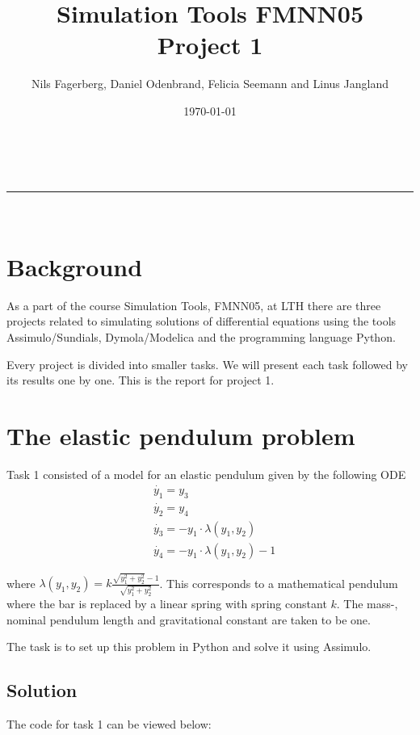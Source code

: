 \documentclass[a4paper,11pt]{article}
\makeatletter
\newcommand{\linia}{\rule{\linewidth}{0.5pt}}
\theoremstyle{mytheor}
\renewcommand{\maketitle}{
\begin{center}
\vspace{2ex}
{\huge \textsc{\@title}}
\vspace{1ex}
\\
\linia\\
\@author \hfill \@date
\vspace{4ex}
\end{center}
}
\makeatother
\begin{document}
\title{Simulation Tools FMNN05 \\Project 1}

\author{Nils Fagerberg, Daniel Odenbrand, Felicia Seemann and Linus Jangland}

\date{\today}

\maketitle

\section*{Background}
As a part of the course Simulation Tools, FMNN05, at LTH there are three projects related to simulating solutions of differential equations using the tools Assimulo/Sundials, Dymola/Modelica and the programming language Python. 

Every project is divided into smaller tasks. We will present each task followed by its results one by one. This is the report for project 1.

\section{The elastic pendulum problem}
Task 1 consisted of a model for an elastic pendulum given by the following ODE
\begin{align}
& \dot{y_1} = y_3 \\
& \dot{y_2} = y_4 \\
& \dot{y_3} = -y_1 \cdot \lambda (y_1, y_2) \\
& \dot{y_4} = -y_1 \cdot \lambda (y_1, y_2)  - 1
\end{align}

where $\lambda (y_1, y_2) = k \frac{\sqrt{y_1^2 + y_2^2} - 1}{\sqrt{y_1^2 + y_2^2}}$. This corresponds to a mathematical pendulum where the bar is replaced by a linear spring with spring constant $k$. The mass-, nominal pendulum length and gravitational constant are taken to be one.

The task is to set up this problem in Python and solve it using Assimulo.

\subsection*{Solution}
The code for task 1 can be viewed below:
\end{document}
